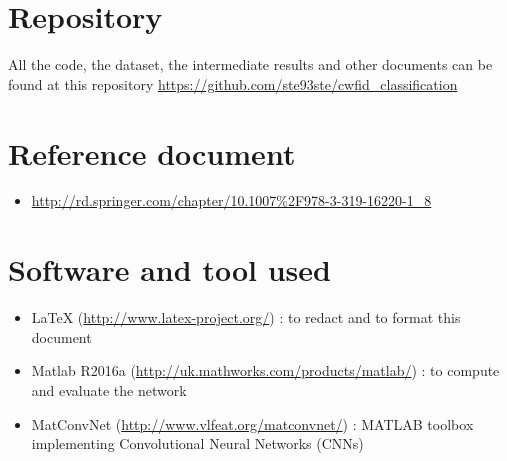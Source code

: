 \documentclass[]{report}
\begin{document}
\section{Repository}

All the code, the dataset, the intermediate results and other documents can be found at this repository \url{https://github.com/ste93ste/cwfid_classification}

\section{Reference document}
 \begin{itemize}
 
 	\item\url{http://rd.springer.com/chapter/10.1007%2F978-3-319-16220-1_8}
	
 \end{itemize}

\section{Software and tool used}

\begin{itemize}
	
	\item LaTeX (\url{http://www.latex-project.org/}) : to redact and to format this document
	
	\item Matlab R2016a (\url{http://uk.mathworks.com/products/matlab/}) : to compute and 					  evaluate the network
	
	\item MatConvNet (\url{http://www.vlfeat.org/matconvnet/}) : MATLAB toolbox implementing 				  Convolutional Neural Networks (CNNs) 
	 
\end{itemize}
\end{document}
